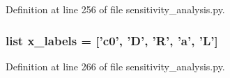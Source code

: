 Definition at line 256 of file sensitivity\-\_\-analysis.\-py.

\hypertarget{namespacesensitivity__analysis_a3996585c5617328485ceb4ae6b83d1de}{
\subsubsection[{x\-\_\-labels}]{\setlength{\rightskip}{0pt plus 5cm}list x\-\_\-labels = \mbox{[}'c0', 'D', 'R', 'a', 'L'\mbox{]}}}\label{namespacesensitivity__analysis_a3996585c5617328485ceb4ae6b83d1de}


Definition at line 266 of file sensitivity\-\_\-analysis.\-py.

